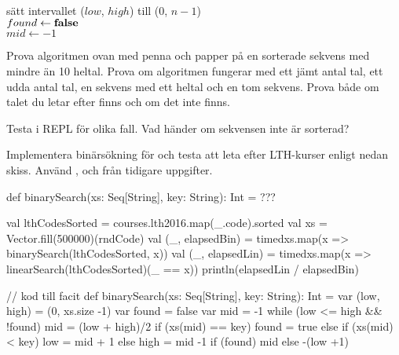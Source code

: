 \begin{algorithm}[H]

 sätt intervallet ($low$, $high$) till ($0$, $n - 1$) \\
 $found \leftarrow \bf{false}$ \\
 $mid \leftarrow -1$\\
\end{algorithm}

\Subtask Prova algoritmen ovan med penna och papper på en sorterade sekvens med mindre än 10 heltal. Prova om algoritmen fungerar med ett jämt antal tal, ett udda antal tal, en sekvens med ett heltal och en tom sekvens. Prova både om talet du letar efter finns och om det inte finns.

\Subtask Testa  i REPL för olika fall. Vad händer om sekvensen inte är sorterad?

\Subtask Implementera binärsökning för  och testa att leta efter LTH-kurser enligt nedan skiss. Använd ,  och  från tidigare uppgifter.
\begin{Code}
def binarySearch(xs: Seq[String], key: String): Int = ??? 

val lthCodesSorted = courses.lth2016.map(_.code).sorted
val xs = Vector.fill(500000)(rndCode)
val (_, elapsedBin) = 
  timed{xs.map(x => binarySearch(lthCodesSorted, x))}
val (_, elapsedLin) = 
  timed{xs.map(x => linearSearch(lthCodesSorted)(_ == x))}
println(elapsedLin / elapsedBin)
\end{Code}

\begin{Code}
// kod till facit
def binarySearch(xs: Seq[String], key: String): Int = {
  var (low, high) = (0, xs.size -1)
  var found = false
  var mid = -1
  while (low <= high && !found) {
    mid = (low + high)/2
    if (xs(mid) == key) found = true 
    else if (xs(mid) < key) low = mid + 1
    else high = mid -1
  }
  if (found) mid else -(low +1)
} 
\end{Code}

